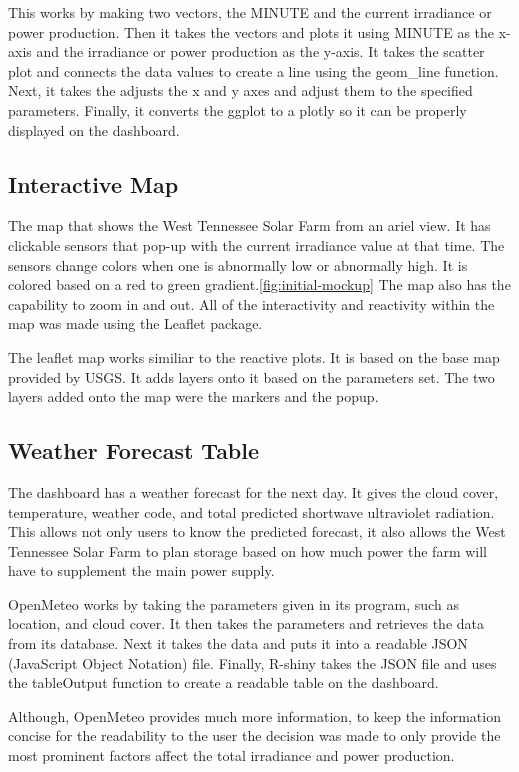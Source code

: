 \documentclass{sigchi}
\begin{document}
This works by making two vectors, the MINUTE and the current irradiance or power production. Then it takes the vectors and plots it using MINUTE as the x-axis and the irradiance or power production as the y-axis. It takes the scatter plot and connects the data values to create a line using the geom\_line function. Next, it takes the adjusts the x and y axes and adjust them to the specified parameters. Finally, it converts the ggplot to a plotly so it can be properly displayed on the dashboard.

\subsection{Interactive Map}
The map that shows the West Tennessee Solar Farm\cite{9_WTSF} from an ariel view. It has clickable sensors that pop-up with the current irradiance value at that time. The sensors change colors when one is abnormally low or abnormally high. It is colored based on a red to green gradient.\ref{fig:initial-mockup} The map also has the capability to zoom in and out. All of the interactivity and reactivity within the map was made using the Leaflet package.\cite{4_Leaflet} 

The leaflet map works similiar to the reactive plots. It is based on the base map provided by USGS. It adds layers onto it based on the parameters set. The two layers added onto the map were the markers and the popup. 

\subsection{Weather Forecast Table}
The dashboard has a weather forecast for the next day. It gives the cloud cover, temperature, weather code, and total predicted shortwave ultraviolet radiation. This allows not only users to know the predicted forecast, it also allows the West Tennessee Solar Farm to plan storage based on how much power the farm will have to supplement the main power supply. 

OpenMeteo works by taking the parameters given in its program, such as location, and cloud cover. It then takes the parameters and retrieves the data from its database. Next it takes the data and puts it into a readable JSON (JavaScript Object Notation) file. Finally, R-shiny takes the JSON file and uses the tableOutput function to create a readable table on the dashboard.

Although, OpenMeteo provides much more information, to keep the information concise for the readability to the user the decision was made to only provide the most prominent factors affect the total irradiance and power production.
\end{document}
